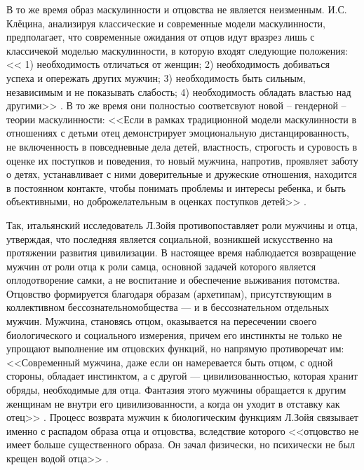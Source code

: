 \documentclass{../../common/thesisbyxetex}
\begin{document}
В то же время образ маскулинности и отцовства не является неизменным. И.С. Клёцина, анализируя
классические и современные модели маскулинности, предполагает, что современные ожидания от отцов
идут вразрез лишь с классичекой моделью маскулинности, в которую входят следующие положения:
<< 1) необходимость отличаться от женщин; 2)
необходимость добиваться успеха и опережать других мужчин; 3) необходимость быть сильным,
независимым и не показывать слабость; 4) необходимость обладать властью над другими>> \cite{clec}.
В то же время они полностью соответсвуют новой -- гендерной -- теории маскулинности: <<Если в рамках
традиционной модели маскулинности в отношениях с детьми отец демонстрирует эмоциональную
дистанцированность, не включенность в повседневные дела детей, властность, строгость и суровость в
оценке их поступков и поведения, то новый мужчина, напротив, проявляет заботу о детях, устанавливает
с ними доверительные и дружеские отношения, находится в постоянном контакте, чтобы понимать проблемы
и интересы ребенка, и быть объективными, но доброжелательным в оценках поступков детей>>
\cite{clec}.

Так, итальянский исследователь Л.Зойя противопоставляет роли
мужчины и отца, утверждая, что последняя является социальной,
возникшей искусственно на протяжении развития цивилизации. В настоящее время наблюдается 
возвращение мужчин от роли отца к роли самца, основной задачей которого является оплодотворение
самки, а не воспитание и обеспечение выживания потомства. Отцовство формируется благодаря 
образам (архетипам), присутствующим в коллективном бессознательномобщества --- и в 
бессознательном отдельных мужчин. Мужчина, становясь отцом, оказывается на пересечении 
своего биологического и социального измерения, причем его инстинкты не только не упрощают 
выполнение им отцовских функций, но напрямую противоречат им: <<Современный мужчина, даже 
если он намеревается быть отцом, с одной стороны, обладает инстинктом, а с другой --- 
цивилизованностью, которая хранит обряды, необходимые для отца. Фантазия этого мужчины 
обращается к другим женщинам не внутри его цивилизованности, а когда он уходит в отставку 
как отец>> \cite[270]{zo}. Процесс возврата мужчин к биологическим функциям Л.Зойя связывает 
именно с распадом образа отца и отцовства, вследствие которого <<отцовство не имеет больше 
существенного образа. Он зачал физически, но психически не был крещен водой отца>> \cite[270]{zo}.
\end{document}

